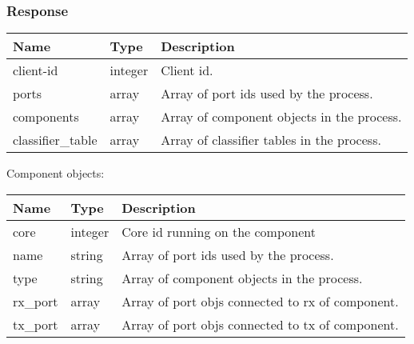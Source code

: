 \documentclass[a4paper,11pt,openany,oneside,english]{sphinxmanual}
\begin{document}
\subsubsection{Response}
\label{\detokenize{api_ref/spp_vf:response}}

\begin{savenotes}\sphinxattablestart
\centering
{}
\sphinxthecaptionisattop
{}\label{\detokenize{api_ref/spp_vf:id20}}\label{\detokenize{api_ref/spp_vf:table-spp-ctl-spp-vf-res}}
\sphinxaftertopcaption
\begin{tabulary}{\linewidth}[t]{|T|T|T|}
\hline
\sphinxstyletheadfamily 
Name
&\sphinxstyletheadfamily 
Type
&\sphinxstyletheadfamily 
Description
\\
\hline
client-id
&
integer
&
Client id.
\\
\hline
ports
&
array
&
Array of port ids used by the process.
\\
\hline
components
&
array
&
Array of component objects in the process.
\\
\hline
classifier\_table
&
array
&
Array of classifier tables in the process.
\\
\hline
\end{tabulary}
\par
\sphinxattableend\end{savenotes}

Component objects:


\begin{savenotes}\sphinxattablestart
\centering
{}
\sphinxthecaptionisattop
{}\label{\detokenize{api_ref/spp_vf:id21}}\label{\detokenize{api_ref/spp_vf:table-spp-ctl-spp-vf-res-comp}}
\sphinxaftertopcaption
\begin{tabulary}{\linewidth}[t]{|T|T|T|}
\hline
\sphinxstyletheadfamily 
Name
&\sphinxstyletheadfamily 
Type
&\sphinxstyletheadfamily 
Description
\\
\hline
core
&
integer
&
Core id running on the component
\\
\hline
name
&
string
&
Array of port ids used by the process.
\\
\hline
type
&
string
&
Array of component objects in the process.
\\
\hline
rx\_port
&
array
&
Array of port objs connected to rx of component.
\\
\hline
tx\_port
&
array
&
Array of port objs connected to tx of component.
\\
\hline
\end{tabulary}
\par
\sphinxattableend\end{savenotes}
\end{document}

